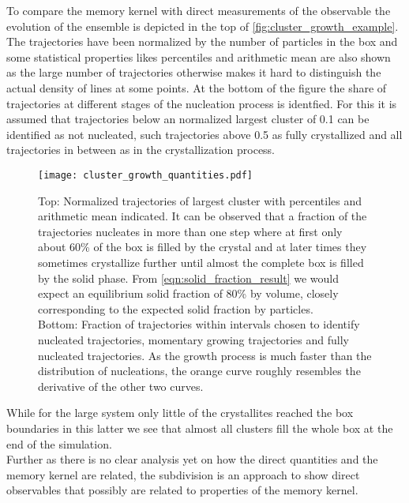 To compare the memory kernel with direct measurements of the observable the evolution of the ensemble is depicted in the top of \autoref{fig:cluster_growth_example}. The trajectories have been normalized by the number of particles in the box and some statistical properties likes percentiles and arithmetic mean are also shown as the large number of trajectories otherwise makes it hard to distinguish the actual density of lines at some points. At the bottom of the figure the share of trajectories at different stages of the nucleation process is identfied. For this it is assumed that trajectories below an normalized largest cluster of 0.1 can be identified as not nucleated, such trajectories above 0.5 as fully crystallized and all trajectories in between as in the crystallization process.\\

\begin{figure}[ht]
\centering
\texttt{[image: cluster\_growth\_quantities.pdf]}
\caption[Largest cluster trajectories of small system with percentiles and average]{Top: Normalized trajectories of largest cluster with percentiles and arithmetic mean indicated. It can be observed that a fraction of the trajectories nucleates in more than one step where at first only about 60\% of the box is filled by the crystal and at later times they sometimes crystallize further until almost the complete box is filled by the solid phase. From \autoref{eqn:solid_fraction_result} we would expect an equilibrium solid fraction of 80\% by volume, closely corresponding to the expected solid fraction by particles.\\
Bottom: Fraction of trajectories within intervals chosen to identify nucleated trajectories, momentary growing trajectories and fully nucleated trajectories. As the growth process is much faster than the distribution of nucleations, the orange curve roughly resembles the derivative of the other two curves.}
\label{fig:cluster_growth_example}
\end{figure}

While for the large system only little of the crystallites reached the box boundaries in this latter we see that almost all clusters fill the whole box at the end of the simulation.\\
Further as there is no clear analysis yet on how the direct quantities and the memory kernel are related, the subdivision is an approach to show direct observables that possibly are related to properties of the memory kernel.\\

